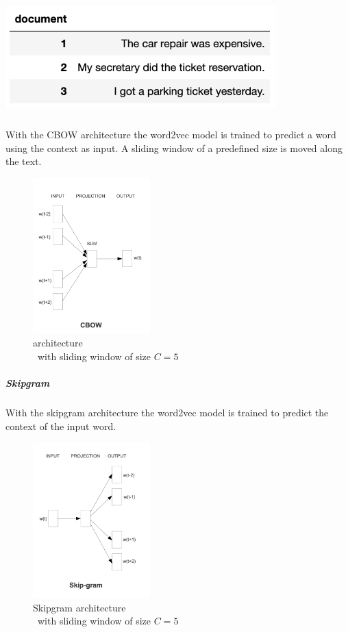 		\includegraphics[height=4cm]{Bilder/word2vec/documents.png}
		
		\subparagraph{} 
		With the \ac{CBOW} architecture the word2vec model is trained to predict a word using the context as input. A sliding window of a predefined size is moved along the text. 
		
		\begin{figure}[ht]
			\centering
			\includegraphics[height=6cm]{Bilder/word2vec/architecture_cbow.png}
			\caption{ architecture\\\ with sliding window of size $C=5$ }
			\label{fig:cbow-architecture}
		\end{figure}
	
		\subparagraph{Skipgram} 
		With the skipgram architecture the word2vec model is trained to predict the context of the input word.
		
		\begin{figure}[ht]
			\centering
			\includegraphics[height=6cm]{Bilder/word2vec/architecture_skipgram.png}
			\caption{Skipgram architecture\\\ with sliding window of size $C=5$ }
			\label{fig:cbow-architecture}
		\end{figure}
	
